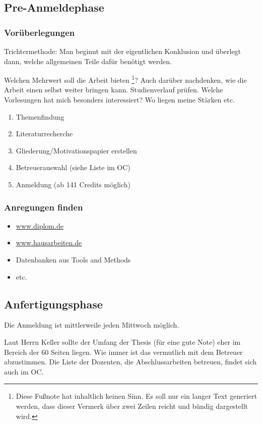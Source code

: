 \documentclass[12pt,oneside,titlepage]{scrartcl}
\begin{document}
\subsection{Pre-Anmeldephase}
\subsubsection{Vorüberlegungen}
Trichtermethode: Man beginnt mit der eigentlichen  Konklusion und überlegt dann, welche allgemeinen Teile dafür benötigt werden.

Welchen Mehrwert soll die Arbeit bieten \footnote{Diese Fu\ss note hat inhaltlich keinen Sinn. Es soll nur ein langer Text generiert werden, dass dieser Vermerk über zwei Zeilen reicht und bündig dargestellt wird.}? Auch darüber nachdenken, wie die Arbeit einen selbst weiter bringen kann. Studienverlauf prüfen. Welche Vorlesungen hat mich besonders interessiert? Wo liegen meine Stärken etc.

\begin{enumerate}
\item Themenfindung
\item Literaturrecherche
\item Gliederung/Motivationspapier erstellen
\item Betreuerauswahl (siehe Liste im \ac{OC})
\item Anmeldung (ab 141 Credits möglich)
\end{enumerate}

\subsubsection{Anregungen finden}
\begin{itemize}
\item \href{http://www.diplom.de}{www.diplom.de}
\item \href{http://www.hausarbeiten.de}{www.hausarbeiten.de}
\item Datenbanken aus Tools and Methods
\item etc.
\end{itemize}

\newpage
\subsection{Anfertigungsphase}
Die Anmeldung ist mittlerweile jeden Mittwoch möglich.

Laut Herrn Keller sollte der Umfang der Thesis (für eine gute Note) eher im Bereich der 60 Seiten liegen. Wie immer ist das vermutlich mit dem Betreuer abzustimmen. Die Liste der Dozenten, die Abschlussarbeiten betreuen, findet sich auch im \ac{OC}.
\end{document}
